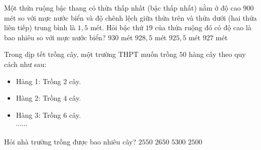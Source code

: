 \begin{ex}%
	Một thửa  ruộng bậc thang có thửa thấp nhất (bậc thấp nhất) nằm ở độ cao $900$ mét so với mực nước biển và độ chênh lệch giữa thửa trên và thửa dưới (hai thửa liên tiếp) trung bình là $1{,}5$ mét. Hỏi bậc thứ $19$ của thửa ruộng đó có độ cao là bao nhiêu so với mực nước biển?
	 \choice
		{$930$ mét} 
		{$928{,}5$  mét}
		{$925{,}5$  mét}
		 {\True $927$ mét}
\end{ex}

\begin{ex}%
	Trong dịp tết trồng cây, một trường THPT muốn  trồng $50$ hàng cây theo quy cách như sau:
	\begin{itemize}
		\item Hàng 1: Trồng  $2$ cây.
		 \item Hàng 2: Trồng $4$ cây.
		\item Hàng 3:  Trồng $6$ cây.\\
		$\cdots \cdots$ 
	\end{itemize}
	 Hỏi nhà trường trồng được bao nhiêu cây?
	\choice 
		{\True $ 2550$} 
		{$ 2650$} 
		{$ 5300$} 
		{$  2500$}
\end{ex}


